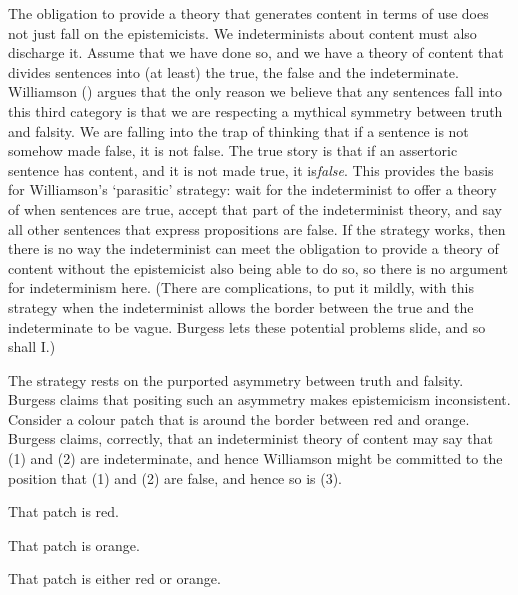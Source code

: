 \documentclass[
  11pt,
  letterpaper,
  DIV=11,
  numbers=noendperiod,
  twoside]{scrartcl}
\providecommand{\tightlist}{%
  \setlength{\itemsep}{0pt}\setlength{\parskip}{0pt}}
\begin{document}
The obligation to provide a theory that generates content in terms of
use does not just fall on the epistemicists. We indeterminists about
content must also discharge it. Assume that we have done so, and we have
a theory of content that divides sentences into (at least) the true, the
false and the indeterminate. Williamson
() argues that the only
reason we believe that any sentences fall into this third category is
that we are respecting a mythical symmetry between truth and falsity. We
are falling into the trap of thinking that if a sentence is not somehow
made false, it is not false. The true story is that if an assertoric
sentence has content, and it is not made true, it is\emph{false}. This
provides the basis for Williamson's `parasitic' strategy: wait for the
indeterminist to offer a theory of when sentences are true, accept that
part of the indeterminist theory, and say all other sentences that
express propositions are false. If the strategy works, then there is no
way the indeterminist can meet the obligation to provide a theory of
content without the epistemicist also being able to do so, so there is
no argument for indeterminism here. (There are complications, to put it
mildly, with this strategy when the indeterminist allows the border
between the true and the indeterminate to be vague. Burgess lets these
potential problems slide, and so shall I.)

The strategy rests on the purported asymmetry between truth and falsity.
Burgess claims that positing such an asymmetry makes epistemicism
inconsistent. Consider a colour patch that is around the border between
red and orange. Burgess claims, correctly, that an indeterminist theory
of content may say that (1) and (2) are indeterminate, and hence
Williamson might be committed to the position that (1) and (2) are
false, and hence so is (3).

\begin{description}
\tightlist
\item[(1)]
That patch is red.
\item[(2)]
That patch is orange.
\item[(3)]
That patch is either red or orange.
\end{description}
\end{document}
